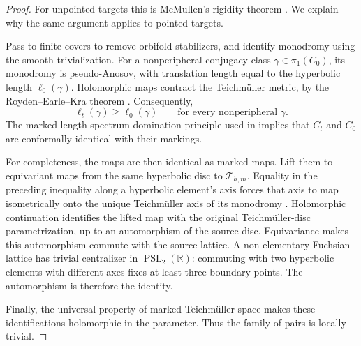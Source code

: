 \documentclass[11pt]{article}
\newcommand{\T}{\mathcal T}
\theoremstyle{remark}
\begin{document}
\begin{proof}
For unpointed targets this is McMullen's rigidity theorem
\cite[Theorem~1]{McM}. We explain why the same argument applies
to pointed targets.

Pass to finite covers to remove orbifold stabilizers, and
identify monodromy using the smooth trivialization. For a
nonperipheral conjugacy class \(\gamma\in\pi_1(C_0)\), its
monodromy is pseudo-Anosov, with translation length equal to
the hyperbolic length \(\ell_0(\gamma)\). Holomorphic maps
contract the Teichm\"uller metric, by the
Royden--Earle--Kra theorem \cite{Royden,EK}. Consequently,
\[
\ell_t(\gamma)\geq \ell_0(\gamma)
\qquad\text{for every nonperipheral }\gamma.
\]
The marked length-spectrum domination principle used in
\cite[proof of Theorem~1, fact~(1)]{McM} implies that \(C_t\)
and \(C_0\) are conformally identical with their markings.

For completeness, the maps are then identical as marked maps.
Lift them to equivariant maps from the same hyperbolic disc to
\(\T_{h,m}\). Equality in the preceding inequality along a
hyperbolic element's axis forces that axis to map isometrically
onto the unique Teichm\"uller axis of its monodromy
\cite{Bers}. Holomorphic continuation identifies the lifted map
with the original Teichm\"uller-disc parametrization, up to an
automorphism of the source disc. Equivariance makes this
automorphism commute with the source lattice. A non-elementary
Fuchsian lattice has trivial centralizer in
\(\operatorname{PSL}_2(\mathbb R)\): commuting with two
hyperbolic elements with different axes fixes at least three
boundary points. The automorphism is therefore the identity.

Finally, the universal property of marked Teichm\"uller space
makes these identifications holomorphic in the parameter.
Thus the family of pairs is locally trivial.
\end{proof}

\end{document}
